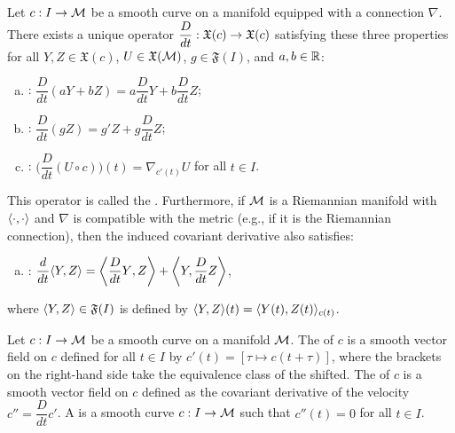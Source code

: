 \documentclass[11pt,a4paper]{article}
\begin{document}
\begin{proposition}
Let $c:I\rightarrow \mathcal{M}$ be a smooth curve on a manifold equipped with a connection $\nabla$. There exists a unique operator $\dfrac{D}{dt}:\mathfrak{X}(c)\rightarrow \mathfrak{X}(c)$ satisfying these three properties for all $Y,Z\in\mathfrak{X}(c)$, $U\in\mathfrak{X}(\mathcal{M})$, $g\in \mathfrak{F}(I)$, and $a,b\in\mathbb{R}$:
\begin{enumerate}[(a)]
    \item {}: $\dfrac{D}{dt}(aY+bZ) = a\dfrac{D}{dt}Y+b\dfrac{D}{dt}Z$;
    \item {}: $\dfrac{D}{dt}(gZ) = g'Z + g\dfrac{D}{dt}Z$;
    \item {}: $\bigg( \dfrac{D}{dt}(U\circ c) \bigg)(t) = \nabla_{c'(t)} U$ for all $t\in I$.
\end{enumerate}
This operator is called the . Furthermore, if $\mathcal{M}$ is a Riemannian manifold with $\langle \cdot, \cdot \rangle$ and $\nabla$ is compatible with the metric (e.g., if it is the Riemannian connection), then the induced covariant derivative also satisfies:
\begin{enumerate}[(d)]
    \item {}: $\dfrac{d}{dt}\langle Y, Z \rangle = \bigg\langle{\dfrac{D}{dt}Y},{Z}\bigg\rangle+\bigg\langle{Y},{\dfrac{D}{dt}}Z\bigg\rangle$,
\end{enumerate}
where $\langle Y, Z \rangle\in\mathfrak{F}(I)$ is defined by $\langle Y, Z \rangle(t) = \langle Y(t), Z(t) \rangle_{c(t)}$.
\end{proposition}

\begin{definition}
Let $c:I\rightarrow \mathcal{M}$ be a smooth curve on a manifold $\mathcal{M}$. The  of $c$ is a smooth vector field on $c$ defined for all $t\in I$ by $c'(t) = [\tau \mapsto c(t+\tau)]$,
where the brackets on the right-hand side take the equivalence class of the shifted. The  of $c$ is a smooth vector field on $c$ defined as the covariant derivative of the velocity $c'' = \dfrac{D}{dt}c'$. A  is a smooth curve $c:I\rightarrow \mathcal{M}$ such that $c''(t) = 0$ for all $t\in I$.
\end{definition}
\end{document}
